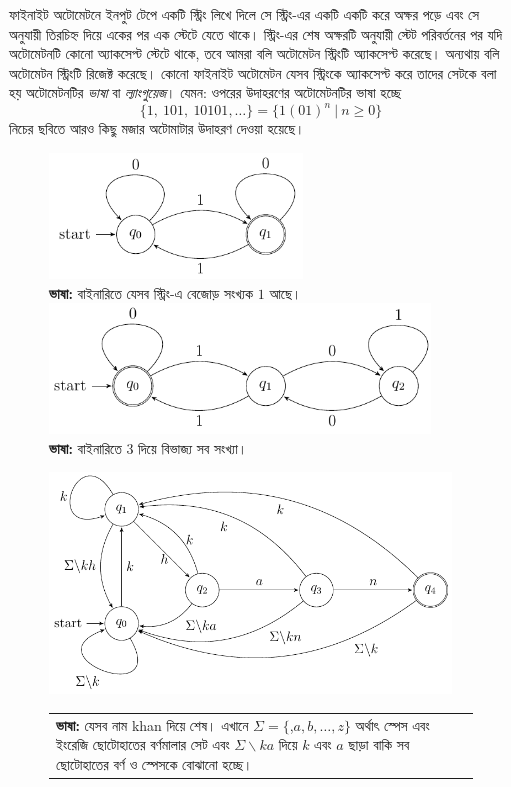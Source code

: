ফাইনাইট অটোমেটনে ইনপুট টেপে একটি স্ট্রিং লিখে দিলে সে স্ট্রিং-এর একটি একটি করে অক্ষর পড়ে এবং সে অনুযায়ী তিরচিহ্ন দিয়ে একের পর এক স্টেটে যেতে থাকে। স্ট্রিং-এর শেষ অক্ষরটি অনুযায়ী স্টেট পরিবর্তনের পর যদি অটোমেটনটি কোনো অ্যাকসেপ্ট স্টেটে থাকে, তবে আমরা বলি অটোমেটন স্ট্রিংটি অ্যাকসেপ্ট করেছে। অন্যথায় বলি অটোমেটন স্ট্রিংটি রিজেক্ট করেছে। কোনো ফাইনাইট অটোমেটন যেসব স্ট্রিংকে অ্যাকসেপ্ট করে তাদের সেটকে বলা হয় অটোমেটনটির \textit{ভাষা} বা \textit{ল্যাংগুয়েজ}। যেমন: ওপরের উদাহরণের অটোমেটনটির ভাষা হচ্ছে 
\[\{1,\ 101,\ 10101,\ldots\}=\{1(01)^n\ |\ n\ge 0\}\]
নিচের ছবিতে আরও কিছু মজার অটোমাটার উদাহরণ দেওয়া হয়েছে।
\begin{figure}[hbt]
	\centering
	\includegraphics[width=0.6\textwidth]{img/pigeonhole_principle/odd1}\\
	\textbf{ভাষা:} বাইনারিতে যেসব স্ট্রিং-এ বেজোড় সংখ্যক $1$ আছে।\\[2pt]
	\includegraphics[width=0.9\textwidth]{img/pigeonhole_principle/3div}\\
	\textbf{ভাষা:} বাইনারিতে $3$ দিয়ে বিভাজ্য সব সংখ্যা।
\end{figure}
\begin{figure}[htb]
	\centering
	\includegraphics[width=0.95\textwidth]{img/pigeonhole_principle/khan}
	\begin{tabular}{p{}}
		\textbf{ভাষা:} যেসব নাম khan দিয়ে শেষ। এখানে $\Sigma=\{$\spacesymbol[0.6em],$a,b,\ldots,z\}$ অর্থাৎ স্পেস এবং ইংরেজি ছোটোহাতের বর্ণমালার সেট এবং $\Sigma\backslash ka$ দিয়ে $k$ এবং $a$ ছাড়া বাকি সব ছোটোহাতের বর্ণ ও স্পেসকে বোঝানো হচ্ছে। 
	\end{tabular}
\end{figure}

